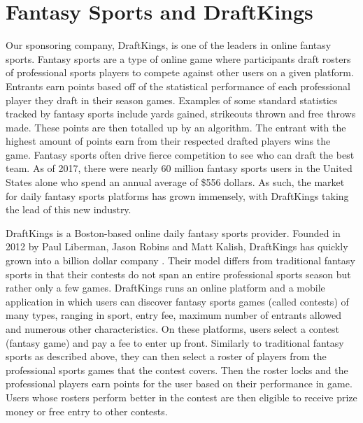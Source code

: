 \section{Fantasy Sports and DraftKings}
Our sponsoring company, DraftKings, is one of the leaders in online fantasy sports. Fantasy sports are a type of online game where participants draft  rosters of professional sports players to compete against other users on a given platform. Entrants earn points based off of the statistical performance of each professional player they draft in their season games. Examples of some standard statistics tracked by fantasy sports include yards gained, strikeouts thrown and free throws made. These points are then totalled up by an algorithm. The entrant with the highest amount of points earn from their respected drafted players wins the game. Fantasy sports often drive fierce competition to see who can draft the best team. As of 2017, there were nearly 60 million fantasy sports users in the United States alone who spend an annual average of \$556 dollars. As such, the market for daily fantasy sports platforms has grown immensely, with DraftKings taking the lead of this new industry. 

DraftKings is a Boston-based online daily fantasy sports provider. Founded in 2012 by Paul Liberman, Jason Robins and Matt Kalish, DraftKings has quickly grown into a billion dollar company \cite{dk}. Their model differs from traditional fantasy sports in that their contests do not span an entire professional sports season but rather only a few games. DraftKings runs an online platform and a mobile application in which users can discover fantasy sports games (called contests) of many types, ranging in sport, entry fee, maximum number of entrants allowed and numerous other characteristics. On these platforms, users select a contest (fantasy game) and pay a fee to enter up front. Similarly to traditional fantasy sports as described above, they can then select a roster of players from the professional sports games that the contest covers. Then the roster locks and the professional players earn points for the user based on their performance in game. Users whose rosters perform better in the contest are then eligible to receive prize money or free entry to other contests. 


